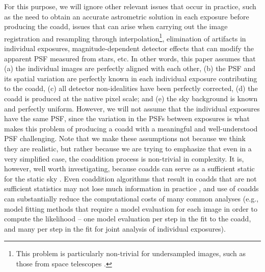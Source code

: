 \documentclass{openjournal}
\newcommand{\irresponse}[1]{{#1}}
\newcommand{\refresponse}[1]{#1}
\begin{document}
For this purpose, we will ignore other relevant issues that occur in practice, such as the need to obtain an accurate astrometric solution in each exposure before producing the coadd, issues that can arise when carrying out the image registration and resampling through interpolation\footnote{This problem is particularly non-trivial for undersampled images\irresponse{, such as those from space telescopes \citep[see discussion in][]{2011ApJ...741...46R}}.}, elimination of artifacts in individual exposures, magnitude-dependent detector effects that can modify the apparent PSF measured from stars, etc.  In other words, this paper assumes that (a) the individual images are perfectly aligned with each other, (b) the PSF and its spatial variation are perfectly known in each individual exposure contributing to the coadd, (c) all detector non-idealities have been perfectly corrected, (d) the coadd is produced at the native pixel scale\refresponse{; and (e) the sky background is known and perfectly uniform}. 
However, we will not assume that the individual exposures have the same PSF, \irresponse{since the} variation in \irresponse{the} PSFs between exposures is what makes this problem of producing a coadd with a meaningful and well-understood PSF challenging. \refresponse{Note that we make these assumptions not because we think they are realistic, but rather because we are trying to emphasize that even in a very simplified case, the coaddition process is non-trivial in complexity.  It is, however, well worth investigating, because  coadds can serve as a sufficient static for the static sky \citep{2017ApJ...836..188Z}.  Even coaddition algorithms that result in coadds that are not sufficient statistics may not lose much information in practice  \citep[e.g.,][]{2018PASJ...70S...5B}, and use of coadds can substantially reduce the computational costs of many common analyses (e.g., model fitting methods that require a model evaluation for each image in order to compute the likelihood -- one model evaluation per step in the fit to the coadd, and many per step in the fit for joint analysis of individual exposures).}
\end{document}
